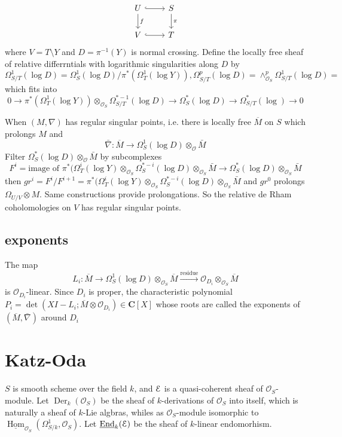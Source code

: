 \documentclass[leqno]{amsart}
\newcommand{\EE}{\EuScript{E}}
\newcommand{\C}{\mathbf C}
\newcommand{\oo}{\mathcal O}
\newcommand{\1}{\mathbf{1}}
\DeclareMathOperator{\Der}{Der}
\DeclareMathOperator{\End}{End}
\DeclareMathOperator{\Hom}{Hom}
\theoremstyle{definition}
\theoremstyle{remark}
\begin{document}
\[
	\begin{tikzcd}
		U\arrow[r,hookrightarrow]
		 \arrow[d,"f"]
		 & S \arrow[d,"\pi"]\\
		V\arrow[r,hookrightarrow] & T
	\end{tikzcd}
\]
where $V=T\setminus Y$ and  $D=\pi^{-1}(Y)$ is normal crossing.
Define the locally free sheaf 
of relative differrntials with logarithmic singularities along  $D$
by 
 \[
	 \Omega_{S/T}^1(\log D)=
	 \Omega_S^1(\log D)/\pi^*(\Omega_T^1(\log Y)),
	 \Omega_{S/T}^p(\log D)=
	 \wedge_{\mathcal{O}_S}^p\Omega_{S/T}^1(\log D)=
\]
which fits into
\[
	0\to\pi^*(\Omega_T^1(\log Y))\otimes_{\mathcal{O}_S}
	\Omega_{S/T}^{*-1}(\log D)\to 
	\Omega_S^*(\log D)\to 
	\Omega_{S/T}^*(\log )\to 0
\]

When $(M,\nabla)$ has regular singular points, i.e.
there is locally free  $\overline{M}$ on  $S$ which prolongs  $M$
and 
 \[
	 \bar{\nabla}\colon \overline{M}
	 \to \Omega_S^1(\log D)\otimes_{\mathcal{O}}\bar{M}
\]
Filter $\Omega_S^*(\log D)\otimes_{\mathcal{O}}\bar{M}$
by subcomplexes
 \[
	F^i=\text{image of }
	\pi^*(\Omega_T^i(\log Y)\otimes_{\mathcal{O}_S}
	\Omega_S^{*-i}(\log D)\otimes_{\mathcal{O}_S}\bar{M}
	\to \Omega_S^*(\log D)\otimes_{\mathcal{O}_S}\bar{M}
\]
then
$gr^i=F^i/F^{i+1}=\pi^*(\Omega_T^i(\log Y)\otimes_{\mathcal{O}_S}
	\Omega_S^{*-i}(\log D)\otimes_{\mathcal{O}_S}\bar{M}$
and $gr^0$ prolongs  $\Omega_{U/V}\otimes M$.
Same constructions provide prolongations.
So the relative de Rham coholomologies on $V$
has regular singular points.

\subsection{exponents}
The map
\[
	L_i\colon \overline{M}
	\to \Omega_S^1(\log D)\otimes_{\mathcal{O}_S}\overline{M}
	\xrightarrow{\text{residue}}
	\mathcal{O}_{D_i}\otimes_{\mathcal{O}_S}\overline{M}
\]
is $\mathcal{O}_{D_i}$-linear.
Since $D_i$ is proper, 
the characteristic polynomial
$P_i=\det(XI-L_i;\overline{M}\otimes\mathcal{O}_{D_i})\in \C[X]$ 
whose roots are called the exponents
of $(\overline{M},\bar{\nabla})$ around $D_i$

\section{Katz-Oda}

$S$ is smooth scheme over the field  $k$,
and $\EE$ is a quasi-coherent sheaf of  $\oo_S$-module.
Let  $\Der_k(\oo_S)$ be the sheaf of $k$-derivations of 
 $\oo_S$ into itself,
which is naturally a sheaf of  $k$-Lie algbras,
whiles as  $\oo_S$-module isomorphic to
$\underline{\Hom}_{\oo_S}(\Omega_{S/k}^1,\oo_S)$.
Let $\underline{\End}_k(\EE)$
be the sheaf of  $k$-linear endomorhism.
\end{document}

